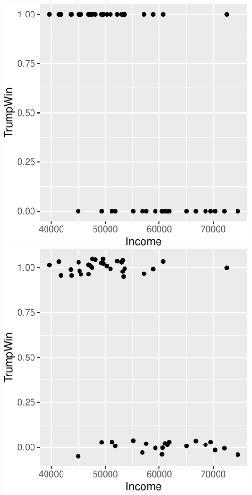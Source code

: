 \documentclass[]{article}
\begin{document}
\includegraphics{17-class-exercise_answers_files/figure-latex/unnamed-chunk-2-1.pdf}
\includegraphics{17-class-exercise_answers_files/figure-latex/unnamed-chunk-2-2.pdf}
\end{document}
